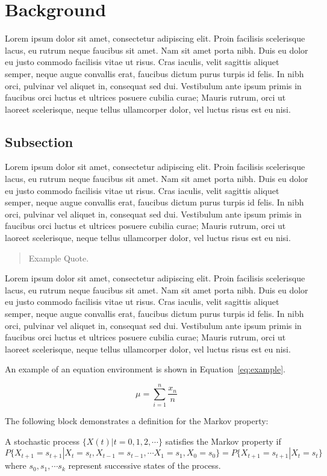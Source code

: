 \chapter{Background}

Lorem ipsum dolor sit amet, consectetur adipiscing elit. Proin facilisis scelerisque lacus, eu rutrum neque faucibus sit amet. Nam sit amet porta nibh. Duis eu dolor eu justo commodo facilisis vitae ut risus. Cras iaculis, velit sagittis aliquet semper, neque augue convallis erat, faucibus dictum purus turpis id felis. In nibh orci, pulvinar vel aliquet in, consequat sed dui. Vestibulum ante ipsum primis in faucibus orci luctus et ultrices posuere cubilia curae; Mauris rutrum, orci ut laoreet scelerisque, neque tellus ullamcorper dolor, vel luctus risus est eu nisi.


\section{Subsection\label{sec:subsection}}

Lorem ipsum dolor sit amet, consectetur adipiscing elit. Proin facilisis scelerisque lacus, eu rutrum neque faucibus sit amet. Nam sit amet porta nibh. Duis eu dolor eu justo commodo facilisis vitae ut risus. Cras iaculis, velit sagittis aliquet semper, neque augue convallis erat, faucibus dictum purus turpis id felis. In nibh orci, pulvinar vel aliquet in, consequat sed dui. Vestibulum ante ipsum primis in faucibus orci luctus et ultrices posuere cubilia curae; Mauris rutrum, orci ut laoreet scelerisque, neque tellus ullamcorper dolor, vel luctus risus est eu nisi.

\begin{quote}
	Example Quote. 
\end{quote}


Lorem ipsum dolor sit amet, consectetur adipiscing elit. Proin facilisis scelerisque lacus, eu rutrum neque faucibus sit amet. Nam sit amet porta nibh. Duis eu dolor eu justo commodo facilisis vitae ut risus. Cras iaculis, velit sagittis aliquet semper, neque augue convallis erat, faucibus dictum purus turpis id felis. In nibh orci, pulvinar vel aliquet in, consequat sed dui. Vestibulum ante ipsum primis in faucibus orci luctus et ultrices posuere cubilia curae; Mauris rutrum, orci ut laoreet scelerisque, neque tellus ullamcorper dolor, vel luctus risus est eu nisi.

An example of an equation environment is shown in Equation~\ref{eq:example}.

\begin{equation}
	\label{eq:example}
 \mu = \sum_{i=1}^n \frac{x_n}{n}
\end{equation}

The following block demonstrates a definition for the Markov property:

\begin{definition}{}{} A stochastic process $\{X(t) | t=0,1,2, \cdots \}$ satisfies the Markov property if
$$
P\{X_{t+1} =   s_{t+1} | X_t =s_t, X_{t-1}=s_{t-1}, \cdots X_1=s_1, X_0=s_0\} =
P\{ X_{t+1} =  s_{t+1} | X_t =s_t \}
$$
where $s_0, s_1, \cdots s_k$ represent successive states of the  process.
\end{definition}


